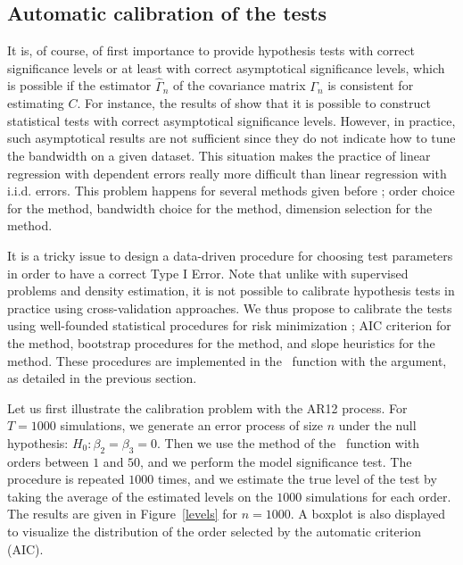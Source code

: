 \subsection{Automatic calibration of the tests}

 It is, of course, of first importance to provide hypothesis tests with correct significance levels or at least  with correct asymptotical significance levels, which is possible if the estimator $\widehat \Gamma_{n}$ of the covariance matrix $\Gamma_{n}$ is consistent for estimating $C$. For instance, the results of \cite{caron2019} show that it is possible to construct statistical tests with correct asymptotical significance levels.  However, in practice, such asymptotical results are not sufficient since they do not indicate how to tune the bandwidth on a given dataset. This situation makes the practice of linear regression with dependent errors really more difficult than linear regression with i.i.d. errors. This problem happens for several methods given before ; order choice for the  method, bandwidth choice for the  method, dimension selection for the   method.

 It is a tricky issue to design a data-driven procedure for choosing test parameters in order to have a correct Type I Error. Note that unlike with supervised problems and density estimation, it is not possible to calibrate hypothesis tests in practice using cross-validation approaches. We thus propose to calibrate the tests using well-founded statistical procedures for risk minimization ; AIC criterion for the  method,  bootstrap procedures for the  method, and slope heuristics for the   method. These procedures are implemented in the \slmf~function with the   argument, as detailed in the previous section.

Let us first illustrate the calibration problem with the AR12 process. For $T=1000$ simulations, we generate an error process of size $n$ under the null hypothesis: $H_{0}: \beta_{2} = \beta_{3} = 0$. Then we use the  method of the \slmf~function with orders between $1$ and $50$, and we perform the model significance test. The procedure is repeated $1000$ times, and we estimate the true level of the test by taking the average of the estimated levels on the $1000$ simulations for each order. The results are given in Figure~\ref{levels} for $n=1000$. 
A boxplot is also displayed to visualize the distribution of the order selected by the automatic criterion (AIC).

